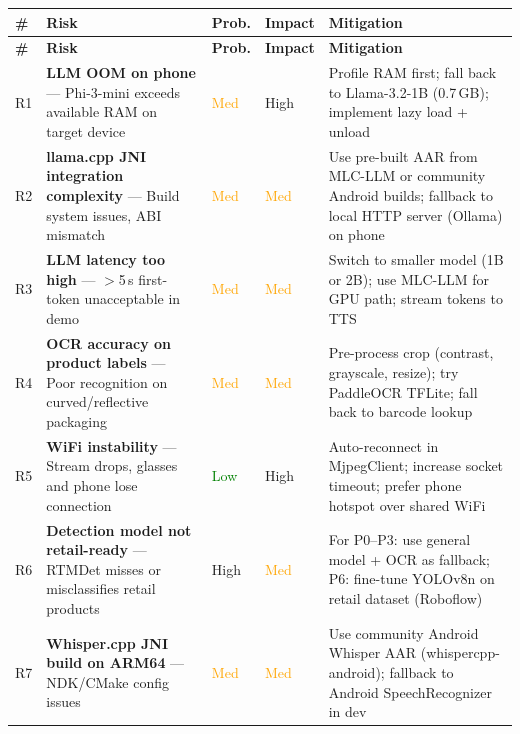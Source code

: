 \documentclass[11pt,a4paper]{article}
\begin{document}
\begin{longtable}{C{0.4cm} L{3.8cm} C{1.4cm} C{1.4cm} L{5.5cm}}
\toprule
\textbf{\#} & \textbf{Risk} & \textbf{Prob.} & \textbf{Impact} & \textbf{Mitigation} \\
\midrule
\endfirsthead
\toprule
\textbf{\#} & \textbf{Risk} & \textbf{Prob.} & \textbf{Impact} & \textbf{Mitigation} \\
\midrule
\endhead
\bottomrule
\endfoot

R1 & \textbf{LLM OOM on phone} — Phi-3-mini exceeds available RAM on target device
  & \textcolor{orange}{Med}
  & \textcolor{accent}{High}
  & Profile RAM first; fall back to Llama-3.2-1B (0.7\,GB); implement lazy load + unload \\

R2 & \textbf{llama.cpp JNI integration complexity} — Build system issues, ABI mismatch
  & \textcolor{orange}{Med}
  & \textcolor{orange}{Med}
  & Use pre-built AAR from MLC-LLM or community Android builds; fallback to local HTTP server (Ollama) on phone \\

R3 & \textbf{LLM latency too high} — $>$5\,s first-token unacceptable in demo
  & \textcolor{orange}{Med}
  & \textcolor{orange}{Med}
  & Switch to smaller model (1B or 2B); use MLC-LLM for GPU path; stream tokens to TTS \\

R4 & \textbf{OCR accuracy on product labels} — Poor recognition on curved/reflective packaging
  & \textcolor{orange}{Med}
  & \textcolor{orange}{Med}
  & Pre-process crop (contrast, grayscale, resize); try PaddleOCR TFLite; fall back to barcode lookup \\

R5 & \textbf{WiFi instability} — Stream drops, glasses and phone lose connection
  & \textcolor{green}{Low}
  & \textcolor{accent}{High}
  & Auto-reconnect in MjpegClient; increase socket timeout; prefer phone hotspot over shared WiFi \\

R6 & \textbf{Detection model not retail-ready} — RTMDet misses or misclassifies retail products
  & \textcolor{accent}{High}
  & \textcolor{orange}{Med}
  & For P0--P3: use general model + OCR as fallback; P6: fine-tune YOLOv8n on retail dataset (Roboflow) \\

R7 & \textbf{Whisper.cpp JNI build on ARM64} — NDK/CMake config issues
  & \textcolor{orange}{Med}
  & \textcolor{orange}{Med}
  & Use community Android Whisper AAR (whispercpp-android); fallback to Android SpeechRecognizer in dev \\


\end{longtable}
\end{document}
